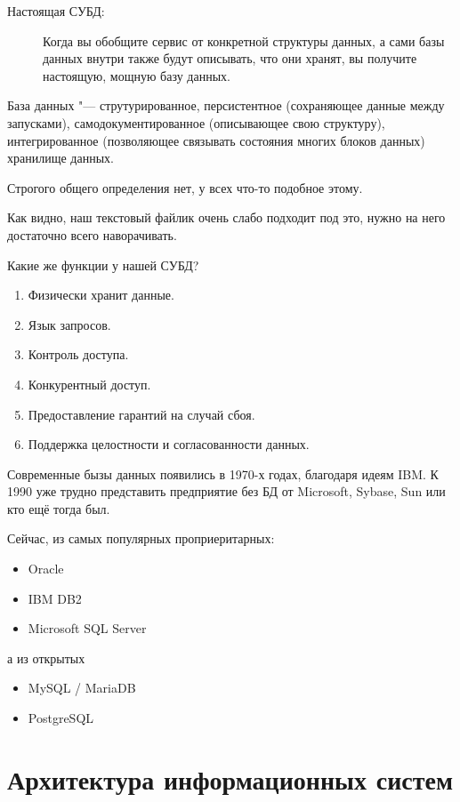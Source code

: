 \begin{description}
\item[Настоящая СУБД:]
	Когда вы обобщите сервис от конкретной структуры данных, а сами базы данных внутри также будут описывать, что они хранят,
	вы получите настоящую, мощную базу данных.
\end{description}

\begin{Def}
	База данных "---
	струтурированное,
	персистентное (сохраняющее данные между запусками),
	самодокументированное (описывающее свою структуру),
	интегрированное (позволяющее связывать состояния многих блоков данных)
	хранилище данных.

	Строгого общего определения нет, у всех что-то подобное этому.
\end{Def}
Как видно, наш текстовый файлик очень слабо подходит под это, нужно на него достаточно всего наворачивать.

Какие же функции у нашей СУБД?
\begin{enumerate}
	\item Физически хранит данные.
	\item Язык запросов.
	\item Контроль доступа.
	\item Конкурентный доступ.
	\item Предоставление гарантий на случай сбоя.
	\item Поддержка целостности и согласованности данных.
\end{enumerate}

Современные бызы данных появились в 1970-х годах, благодаря идеям IBM.
К 1990 уже трудно представить предприятие без БД от Microsoft, Sybase, Sun или кто ещё тогда был.

\begin{samepage}
	Сейчас, из самых популярных проприеритарных:
	\begin{itemize}
		\item Oracle
		\item IBM DB2
		\item Microsoft SQL Server
	\end{itemize}
	а из открытых
	\begin{itemize}
		\item MySQL / MariaDB
		\item PostgreSQL
	\end{itemize}
\end{samepage}

\section{Архитектура информационных систем}


